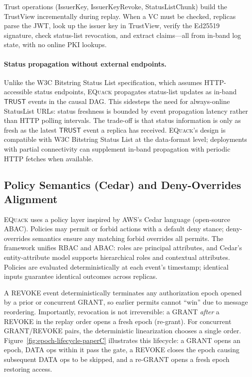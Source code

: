 \documentclass[10pt,journal,compsoc]{IEEEtran}
\newcommand{\equack}{\textsc{EQuack}}
\begin{document}
Trust operations (IssuerKey, IssuerKeyRevoke, StatusListChunk) build the TrustView incrementally during replay. When a VC must be checked, replicas parse the JWT, look up the issuer key in TrustView, verify the Ed25519 signature, check status-list revocation, and extract claims---all from in-band log state, with no online PKI lookups.

\paragraph{Status propagation without external endpoints.}
Unlike the W3C Bitstring Status List specification, which assumes HTTP-accessible status endpoints, \equack{} propagates status-list updates as in-band $\mathsf{TRUST}$ events in the causal DAG. This sidesteps the need for always-online StatusList URLs: status freshness is bounded by event propagation latency rather than HTTP polling intervals. The trade-off is that status information is only as fresh as the latest $\mathsf{TRUST}$ event a replica has received. \equack{}'s design is compatible with W3C Bitstring Status List at the data-format level; deployments with partial connectivity can supplement in-band propagation with periodic HTTP fetches when available.

\subsection{Policy Semantics (Cedar) and Deny-Overrides Alignment}

\equack{} uses a policy layer inspired by AWS's Cedar language (open-source ABAC). Policies may permit or forbid actions with a default deny stance; deny-overrides semantics ensure any matching forbid overrides all permits. The framework unifies RBAC and ABAC: roles are principal attributes, and Cedar's entity-attribute model supports hierarchical roles and contextual attributes. Policies are evaluated deterministically at each event's timestamp; identical inputs guarantee identical outcomes across replicas.

A REVOKE event deterministically terminates any authorization epoch opened by a prior or concurrent GRANT, so earlier permits cannot ``win'' due to message reordering. Importantly, revocation is not irreversible: a GRANT \emph{after} a REVOKE in the replay order opens a fresh epoch (re-grant). For concurrent GRANT/REVOKE pairs, the deterministic linearization chooses a single order. Figure~\ref{fig:epoch-lifecycle-paperC} illustrates this lifecycle: a GRANT opens an epoch, DATA ops within it pass the gate, a REVOKE closes the epoch causing subsequent DATA ops to be skipped, and a re-GRANT opens a fresh epoch restoring access.
\end{document}
